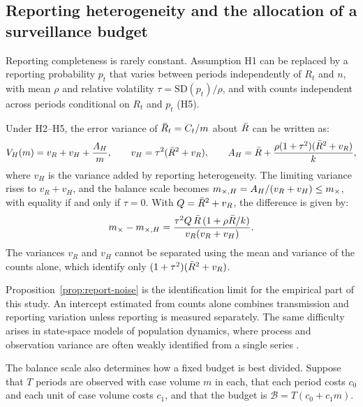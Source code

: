 \subsection{Reporting heterogeneity and the allocation of a surveillance budget}
\label{sec:bg-reporting}

Reporting completeness is rarely constant. Assumption H1 can be replaced by a reporting probability $p_t$ that varies between periods independently of $R_t$ and $n$, with mean $\rho$ and relative volatility $\tau=\mathrm{SD}(p_t)/\rho$, and with counts independent across periods conditional on $R_t$ and $p_t$ (H5).

\begin{proposition}
\label{prop:report-noise}
Under H2--H5, the error variance of $\Rhat_t=C_t/m$ about $\bar{R}$ can be written as:
\begin{equation}
  V_H(m)=v_R+v_H+\frac{A_H}{m},\qquad
  v_H=\tau^2(\bar{R}^2+v_R),\qquad A_H=\bar{R}+\frac{\rho(1+\tau^2)(\bar{R}^2+v_R)}{k},
  \label{eq:vH-AH}
\end{equation}
where $v_H$ is the variance added by reporting heterogeneity. The limiting variance rises to $v_R+v_H$, and the balance scale becomes $m_{\times,H}=A_H/(v_R+v_H)\le m_{\times}$, with equality if and only if $\tau=0$. With $Q=\bar{R}^2+v_R$, the difference is given by:
\begin{equation}
  m_{\times}-m_{\times,H}=\frac{\tau^2Q\,\bar{R}\,(1+\rho\bar{R}/k)}{v_R(v_R+v_H)}.
  \label{eq:mx-gap}
\end{equation}
The variances $v_R$ and $v_H$ cannot be separated using the mean and variance of the counts alone, which identify only $(1+\tau^2)(\bar{R}^2+v_R)$.
\end{proposition}

Proposition~\ref{prop:report-noise} is the identification limit for the empirical part of this study. An intercept estimated from counts alone combines transmission and reporting variation unless reporting is measured separately. The same difficulty arises in state-space models of population dynamics, where process and observation variance are often weakly identified from a single series \citep{knape2008estimability, augermethe2016state}.

The balance scale also determines how a fixed budget is best divided. Suppose that $T$ periods are observed with case volume $m$ in each, that each period costs $c_0$ and each unit of case volume costs $c_1$, and that the budget is $\mathcal{B}=T(c_0+c_1m)$.

